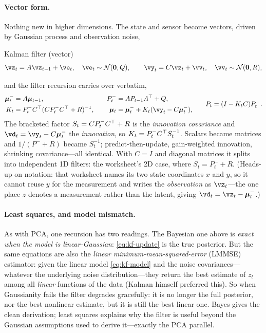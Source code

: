 \documentclass[11pt]{article}
\theoremstyle{plain}
\theoremstyle{definition}
\theoremstyle{remark}
\theoremstyle{definition}
\newcommand{\Normal}{\mathcal{N}}
\newcommand{\vmu}{\bm{\mu}}
\begin{document}
\paragraph{Vector form.} Nothing new in higher dimensions. The state and sensor
become vectors, driven by Gaussian process and observation noise,
\begin{genmodel}{Kalman filter (vector)}
\begin{equation}\label{eq:kf-model-vec}
  \vz_t = A\vz_{t-1} + \ve_t, \quad \ve_t \sim \Normal(\mathbf 0, Q),
  \qquad
  \vy_t = C\vz_t + \vv_t, \quad \vv_t \sim \Normal(\mathbf 0, R),
\end{equation}
\end{genmodel}
and the filter recursion carries over verbatim,
\begin{equation}
\begin{aligned}
  \vmu_t^- &= A\vmu_{t-1}, &\quad P_t^- &= A P_{t-1} A\trp + Q, \\
  K_t &= P_t^- C\trp (C P_t^- C\trp + R)^{-1}, &\quad
  \vmu_t &= \vmu_t^- + K_t(\vy_t - C\vmu_t^-),
\end{aligned}
\qquad P_t = (I - K_t C)P_t^-.
\end{equation}
The bracketed factor $S_t = C P_t^- C{^\top} + R$ is the \emph{innovation covariance}
and $\vd_t = \vy_t - C\vmu_t^-$ the \emph{innovation}, so $K_t = P_t^- C{^\top}
S_t^{-1}$. Scalars became matrices and $1/(P^-+R)$ became $S_t^{-1}$;
predict-then-update, gain-weighted innovation, shrinking covariance---all
identical. With $C=I$ and diagonal matrices it splits into independent 1D
filters: the worksheet's 2D case, where $S_t = P_t^- + R$. (Heads-up on notation:
that worksheet names its two state coordinates $x$ and $y$, so it cannot reuse
$y$ for the measurement and writes the \emph{observation} as $\vz_t$---the one
place $z$ denotes a measurement rather than the latent, giving $\vd_t = \vz_t -
\vmu_t^-$.)

\paragraph{Least squares, and model mismatch.} As with PCA, one recursion has two
readings. The Bayesian one above is \emph{exact when the model is
linear-Gaussian}: \eqref{eq:kf-update} is the true posterior. But the same
equations are also the \emph{linear minimum-mean-squared-error} (LMMSE)
estimator: given the linear model \eqref{eq:kf-model} and the noise
covariances---whatever the underlying noise distribution---they return the best
estimate of $z_t$ among all \emph{linear} functions of the data (Kalman himself preferred this). So when
Gaussianity fails the filter degrades gracefully: it is no longer the full
posterior, nor the best nonlinear estimate, but it is still the best linear one.
Bayes gives the clean derivation; least squares explains why the filter is useful
beyond the Gaussian assumptions used to derive it---exactly the PCA parallel.
\end{document}
